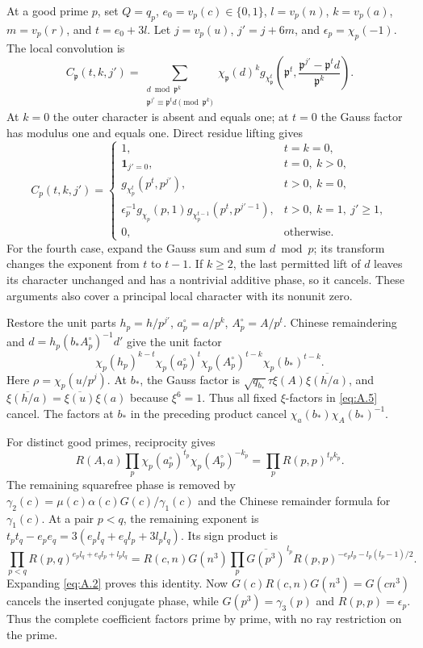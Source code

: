 \documentclass[11pt,a4paper]{article}
\begin{document}
At a good prime \(p\), set \(Q=q_p\), \(e_0=v_p(c)\in\{0,1\}\), \(l=v_p(n)\), \(k=v_p(a)\), \(m=v_p(r)\), and \(t=e_0+3l\). Let \(j=v_p(u)\), \(j'=j+6m\), and \(\epsilon_p=\chi_p(-1)\). The local convolution is \[
C_{\mathfrak p}(t,k,j')=
\sum_{\substack{d\bmod\mathfrak p^k\\\mathfrak p^{j'}\equiv\mathfrak p^td\pmod{\mathfrak p^k}}}
\chi_{\mathfrak p}(d)^k
g_{\chi_{\mathfrak p}^t}\!\left(\mathfrak p^t,
\frac{\mathfrak p^{j'}-\mathfrak p^td}{\mathfrak p^k}\right).
\tag{A.6}\label{eq:A.6}
\] At \(k=0\) the outer character is absent and equals one; at \(t=0\) the Gauss factor has modulus one and equals one. Direct residue lifting gives \[
C_p(t,k,j')=
\begin{cases}
1,&t=k=0,\\
\mathbf1_{j'=0},&t=0,\ k>0,\\
g_{\chi_p^t}(p^t,p^{j'}),&t>0,\ k=0,\\
\epsilon_p^{-1}g_{\chi_p}(p,1)g_{\chi_p^{t-1}}(p^t,p^{j'-1}),
&t>0,\ k=1,\ j'\ge1,\\
0,&\text{otherwise}.
\end{cases}
\tag{A.7}\label{eq:A.7}
\] For the fourth case, expand the Gauss sum and sum \(d\bmod p\); its transform changes the exponent from \(t\) to \(t-1\). If \(k\ge2\), the last permitted lift of \(d\) leaves its character unchanged and has a nontrivial additive phase, so it cancels. These arguments also cover a principal local character with its nonunit zero.

Restore the unit parts \(h_p=h/p^{j'}\), \(a_p^\circ=a/p^k\), \(A_p^\circ=A/p^t\). Chinese remaindering and \(d=h_p(b_*A_p^\circ)^{-1}d'\) give the unit factor \[
\chi_p(h_p)^{k-t}\chi_p(a_p^\circ)^t
\chi_p(A_p^\circ)^{t-k}\chi_p(b_*)^{t-k}.
\] Here \(\rho=\chi_p(u/p^j)\). At \(b_*\), the Gauss factor is \(\sqrt{q_{b_*}}\tau\xi(A)\overline{\xi(h/a)}\), and \(\overline{\xi(h/a)}=\overline{\xi(u)}\xi(a)\) because \(\xi^6=1\). Thus all fixed \(\xi\)-factors in \eqref{eq:A.5} cancel. The factors at \(b_*\) in the preceding product cancel \(\chi_a(b_*)\chi_A(b_*)^{-1}\).

For distinct good primes, reciprocity gives \[
R(A,a)\prod_p\chi_p(a_p^\circ)^{t_p}\chi_p(A_p^\circ)^{-k_p}
=\prod_pR(p,p)^{t_pk_p}.
\] The remaining squarefree phase is removed by \(\gamma_2(c)=\mu(c)\alpha(c)G(c)/\gamma_1(c)\) and the Chinese remainder formula for \(\gamma_1(c)\). At a pair \(p<q\), the remaining exponent is \(t_pt_q-e_pe_q=3(e_pl_q+e_ql_p+3l_pl_q)\). Its sign product is \[
\prod_{p<q}R(p,q)^{e_pl_q+e_ql_p+l_pl_q}
=R(c,n)G(n^3)\prod_p\overline{G(p^3)}^{\,l_p}
R(p,p)^{-e_pl_p-l_p(l_p-1)/2}.
\] Expanding \eqref{eq:A.2} proves this identity. Now \(G(c)R(c,n)G(n^3)=G(cn^3)\) cancels the inserted conjugate phase, while \(G(p^3)=\gamma_3(p)\) and \(R(p,p)=\epsilon_p\). Thus the complete coefficient factors prime by prime, with no ray restriction on the prime.
\end{document}
